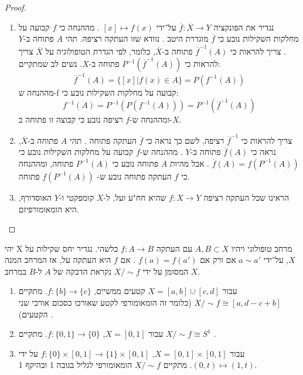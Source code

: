 \documentclass{tstextbook}
\begin{document}
\begin{proof}
  \begin{enumerate}
    \item נגדיר את הפונקציה \(\overline{f}:\overline{X}\rightarrow Y\) על־ידי \([x]\mapsto f(x)\) . מההנחה כי \(f\) קבועה על מחלקות השקילות נובע כי \(\overline{f}\) מוגדרת היטב . נוודא שזו העתקה רציפה. תהי \(A\) פתוחה ב-\(Y\). צריך להראות כי \(\overline{f}^{-1}(A)\) פתוחה ב-\(\overline{X}\), כלומר, לפי הגדרת הטופולוגיה על \(\overline{X}\) צריך להראות כי \(P^{-1}(\overline{f}^{-1}(A))\) פתוחה ב-\(X\). נשים לב שמתקיים: 
$$\overline{f}^{-1}(A)=\{[x]|f(x)\in A\}=P(f^{-1}(A))$$
מההנחה ש-f קבועה על מחלקות השקילות נובע כי:
$$f^{-1}(A)=P^{-1}(P(f^{-1}(A)))=P^{-1}(\overline{f}^{-1}(A))$$
ומההנחה ש-\(f\) רציפה נובע כי קבוצה זו פתוחה ב-\(X\).


    \item צריך להראות כי \(\overline{f}^{-1}\) רציפה, לשם כך נראה כי \(\overline{f}\) העתקה פתוחה . תהי \(A\) פתוחה ב-\(\overline{X}\), נראה כי \(\overline{f}(A)\) פתוחה ב-\(Y\) . מההנחה ש-\(f\) קבועה על מחלקות השקילות נובע כי \(\overline{f}(A)=f(P^{-1}(A))\) . אבל מהיות \(A\) פתוחה נובע כי \(P^{-1}(A)\) פתוחה, ומההנחה כי \(f\) העתקה פתוחה נובע ש- \(f(P^{-1}(A))\) פתוחה. 


    \item הראינו שכל העתקה רציפה \(f:X\rightarrow Y\) שהיא חח"ע ועל, ל-\(X\) קומפקטי ו-\(Y\) האוסדורף, היא הומאומורפיזם. 


  \end{enumerate}
\end{proof}
\begin{definition}[הדבקה]
יהי X מרחב טופולוגי ויהיו \(A,B\subset X\) עם העתקה \(f:A\rightarrow B\) כלשהי. נגדיר יחס שקילות על \(X\), על־ידי \(a\sim a'\) אם ורק אם \(f(a)=f(a')\) . אם \(f\) היא העתקה על, אז המרחב המנה המסומן על ידי \(X/\sim f\) נקראת הדבקה של \(A\) ל-\(B\) במרחב \(X\).

\end{definition}
\begin{example}
  \begin{enumerate}
    \item עבור \(X=[a,b]\cup[c,d]\) קטעים ממשיים, \(f:\{b\}\rightarrow\{c\}\). מתקיים \(X/\sim f\cong [a,d-c+b]\) (כלומר זה הומאומורפי לקטע שאורכו כסכום אורכי שני הקטעים) . 


    \item עבור \(X=[0,1]\), \(f:\{0,1\}\rightarrow\{0\}\). מתקיים \(X/\sim f\cong S^{1}\) . 


    \item עבור \(X=[0,1]\times[0,1]\), \(f:\{0\}\times[0,1]\rightarrow\{1\}\times[0,1]\) על ידי \((0,t)\mapsto(1,t)\). מתקיים \(X/\sim f\) הומאומורפי לגליל בגובה 1 ובהיקף 1. 


  \end{enumerate}
\end{example}
\end{document}
